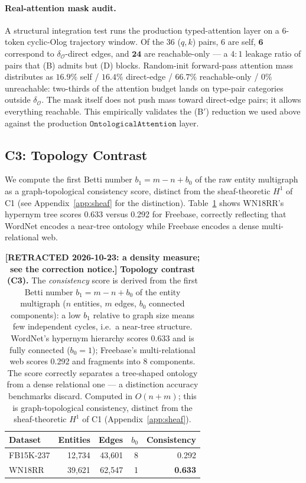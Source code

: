 \paragraph{Real-attention mask audit.} A structural integration test
runs the production typed-attention layer on a 6-token cyclic-Olog
trajectory window. Of the $36$ ($q,k$) pairs, $6$ are self,
$\mathbf{6}$ correspond to $\delta_\mathcal{O}$-direct edges, and
$\mathbf{24}$ are reachable-only --- a $4{:}1$ leakage ratio of pairs
that (B) admits but (D) blocks. Random-init forward-pass attention mass
distributes as $16.9\%$ self / $16.4\%$ direct-edge / $\mathbf{66.7\%}$
reachable-only / $0\%$ unreachable: two-thirds of the attention budget
lands on type-pair categories outside $\delta_\mathcal{O}$. The mask
itself does not push mass toward direct-edge pairs; it allows
everything reachable. This empirically validates the (B$'$) reduction we
used above against the production
$\texttt{OntologicalAttention}$ layer.

\subsection{C3: Topology Contrast}

We compute the first Betti number $b_1 = m - n + b_0$ of the raw entity multigraph as a graph-topological consistency score, distinct from the sheaf-theoretic $H^1$ of C1 (see Appendix~\ref{app:sheaf} for the distinction).
Table~\ref{tab:topology} shows WN18RR's hypernym tree scores 0.633 versus 0.292 for Freebase, correctly reflecting that WordNet encodes a near-tree ontology while Freebase encodes a dense multi-relational web.

\begin{table}[t]
\centering
\caption{\textbf{\textcolor{red!70!black}{[RETRACTED 2026-10-23: a density measure; see the correction notice.]}} \textbf{Topology contrast (C3).} The \emph{consistency} score is
derived from the first Betti number $b_1 = m - n + b_0$ of the entity
multigraph ($n$ entities, $m$ edges, $b_0$ connected components): a
low $b_1$ relative to graph size means few independent cycles, i.e.\ a
near-tree structure. WordNet's hypernym hierarchy scores 0.633 and is
fully connected ($b_0{=}1$); Freebase's multi-relational web scores
0.292 and fragments into 8 components. The score correctly separates a
tree-shaped ontology from a dense relational one --- a distinction
accuracy benchmarks discard. Computed in $O(n+m)$; this is
graph-topological consistency, distinct from the sheaf-theoretic $H^1$
of C1 (Appendix~\ref{app:sheaf}).}
\label{tab:topology}
\begin{tabular}{lrrrr}
\toprule
Dataset & Entities & Edges & $b_0$ & Consistency \\
\midrule
FB15K-237 & 12{,}734 & 43{,}601 & 8 & 0.292 \\
WN18RR & 39{,}621 & 62{,}547 & 1 & \textbf{0.633} \\
\bottomrule
\end{tabular}
\end{table}

